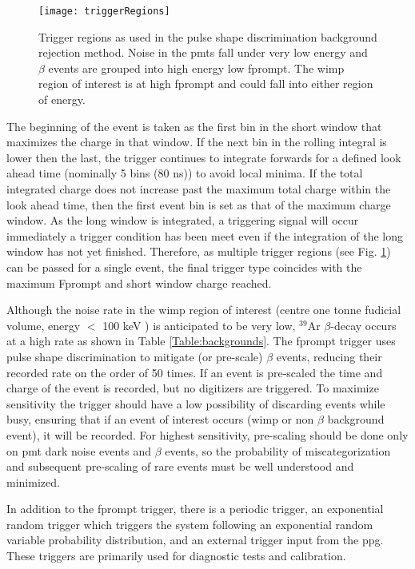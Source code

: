\begin{figure}[ht]
\centering
\texttt{[image: triggerRegions]}
\caption{Trigger regions as used in the pulse shape discrimination background rejection method. Noise in the \gls{pmt}s fall under very low energy and $\beta$ events are grouped into high energy low \gls{fprompt}. The \gls{wimp} region of interest is at high \gls{fprompt} and could fall into either region of energy.}
\label{Fig:triggerRegions}
\end{figure}
The beginning of the event is taken as the first bin in the short window that maximizes the charge in that window. If the next bin in the rolling integral is lower then the last, the trigger continues to integrate forwards for a defined look ahead time (nominally 5 bins (80 ns)) to avoid local minima. If the total integrated charge does not increase past the maximum total charge within the look ahead time, then the first event bin is set as that of the maximum charge window. As the long window is integrated, a triggering signal will occur immediately a trigger condition has been meet even if the integration of the long window has not yet finished. Therefore, as multiple trigger regions (see Fig. \ref{Fig:triggerRegions}) can be passed for a single event, the final trigger type coincides with the maximum Fprompt and short window charge reached.  

Although the noise rate in the \gls{wimp} region of interest (centre one tonne fudicial volume, energy $<$ 100 keV \cite{deap3DarkMatterSearch}) is anticipated to be very low, $^{39}$Ar $\beta$-decay occurs at a high rate as shown in Table \ref{Table:backgrounds}. The \gls{fprompt} trigger uses pulse shape discrimination to mitigate (or pre-scale) $\beta$ events, reducing their recorded rate on the order of 50 times. If an event is pre-scaled the time and charge of the event is recorded, but no digitizers are triggered. To maximize sensitivity the trigger should have a low possibility of discarding events while busy, ensuring that if an event of interest occurs (\gls{wimp} or non $\beta$ background event), it will be recorded. For highest sensitivity, pre-scaling should be done only on \gls{pmt} dark noise events and $\beta$ events, so the probability of miscategorization and subsequent pre-scaling of rare events must be well understood and minimized.

In addition to the \gls{fprompt} trigger, there is a periodic trigger, an exponential random trigger which triggers the system following an exponential random variable probability distribution, and an external trigger input from the \gls{ppg}. These triggers are primarily used for diagnostic tests and calibration.



